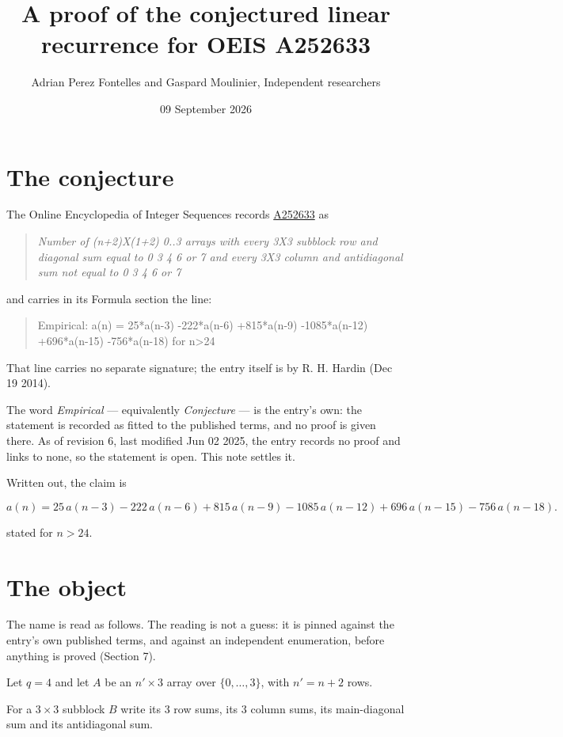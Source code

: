 \documentclass[11pt]{article}
\title{A proof of the conjectured linear recurrence for OEIS A252633}
\author{Adrian Perez Fontelles and Gaspard Moulinier, Independent researchers}
\date{09 September 2026}
\theoremstyle{definition}
\begin{document}
\maketitle
\section{The conjecture}

The Online Encyclopedia of Integer Sequences records \href{https://oeis.org/A252633}{A252633} as

\begin{quote}\itshape Number of (n+2)X(1+2) 0..3 arrays with every 3X3 subblock row and diagonal sum equal to 0 3 4 6 or 7 and every 3X3 column and antidiagonal sum not equal to 0 3 4 6 or 7\end{quote}

and carries in its Formula section the line:

\begin{quote}\ttfamily Empirical: a(n) = 25*a(n-3) -222*a(n-6) +815*a(n-9) -1085*a(n-12) +696*a(n-15) -756*a(n-18) for n>24\end{quote}

That line carries no separate signature; the entry itself is by R. H. Hardin (Dec 19 2014).

The word {\itshape Empirical} --- equivalently {\itshape Conjecture} --- is the entry's own: the statement is recorded as fitted to the published terms, and no proof is given there. As of revision 6, last modified Jun 02 2025, the entry records no proof and links to none, so the statement is open. This note settles it.

Written out, the claim is

\[a(n) = 25\,a(n-3) - 222\,a(n-6) + 815\,a(n-9) - 1085\,a(n-12) + 696\,a(n-15) - 756\,a(n-18).\]

stated for $n > 24$.

\section{The object}

The name is read as follows. The reading is not a guess: it is pinned against the entry's own published terms, and against an independent enumeration, before anything is proved (Section 7).

Let $q = 4$ and let $A$ be an $n' \times 3$ array over $\{0,\dots,3\}$, with $n' = n + 2$ rows.

For a $3\times3$ subblock $B$ write its 3 row sums, its 3 column sums, its main-diagonal sum and its antidiagonal sum.
\end{document}
